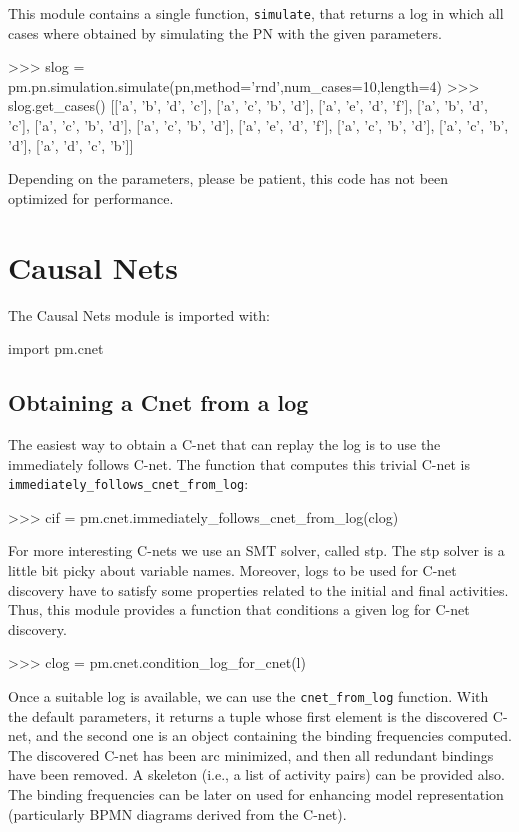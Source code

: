 \documentclass[a4paper,10pt]{book}
\begin{document}
This module contains a single function, \texttt{simulate}, that returns a log in which all cases where obtained by simulating the PN with the given parameters.\\

\begin{pycode}
>>> slog = pm.pn.simulation.simulate(pn,method='rnd',num_cases=10,length=4)
>>> slog.get_cases()
[['a', 'b', 'd', 'c'],
['a', 'c', 'b', 'd'],
['a', 'e', 'd', 'f'],
['a', 'b', 'd', 'c'],
['a', 'c', 'b', 'd'],
['a', 'c', 'b', 'd'],
['a', 'e', 'd', 'f'],
['a', 'c', 'b', 'd'],
['a', 'c', 'b', 'd'],
['a', 'd', 'c', 'b']]
\end{pycode}

Depending on the parameters, please be patient, this code has not been optimized for performance.

\chapter{Causal Nets}
The Causal Nets module is imported with:\\
\begin{pycode}
import pm.cnet
\end{pycode}

\section{Obtaining a Cnet from a log}
The easiest way to obtain a C-net that can replay the log is to use the immediately follows C-net. The function that computes this trivial C-net is \texttt{immediately\_follows\_cnet\_from\_log}:\\

\begin{pycode}
>>> cif = pm.cnet.immediately_follows_cnet_from_log(clog)
\end{pycode}

For more interesting C-nets we use an SMT solver, called stp. The stp solver is a little bit picky about variable names. Moreover, logs to be used for C-net discovery have to satisfy some properties related to the initial and final activities. Thus, this module provides a function that conditions a given log for C-net discovery.\\

\begin{pycode}
>>> clog = pm.cnet.condition_log_for_cnet(l)
\end{pycode}

Once a suitable log is available, we can use the \texttt{cnet\_from\_log} function. With the default parameters, it returns a tuple whose first element is the discovered C-net, and the second one is an object containing the binding frequencies computed. The discovered C-net has been arc minimized, and then all redundant bindings have been removed. A skeleton (i.e., a list of activity pairs) can be provided also. The binding frequencies can be later on used for enhancing model representation (particularly BPMN diagrams derived from the C-net).
\end{document}
